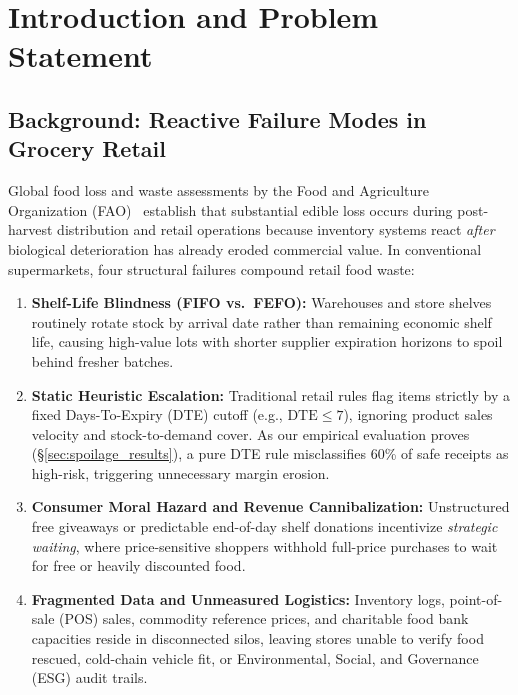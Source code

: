 \documentclass[11pt,a4paper]{article}
\renewcommand{\_}{\oldunderscore\allowbreak}
\begin{document}
\vspace{4mm}
\tableofcontents
\listoffigures
\listoftables
\newpage
{}

\section{Introduction and Problem Statement}

\subsection{Background: Reactive Failure Modes in Grocery Retail}
Global food loss and waste assessments by the Food and Agriculture Organization (FAO)~\cite{fao2019} establish that substantial edible loss occurs during post-harvest distribution and retail operations because inventory systems react \emph{after} biological deterioration has already eroded commercial value. In conventional supermarkets, four structural failures compound retail food waste:
\begin{enumerate}[leftmargin=18pt, itemsep=2pt]
    \item \textbf{Shelf-Life Blindness (FIFO vs.\ FEFO):} Warehouses and store shelves routinely rotate stock by arrival date rather than remaining economic shelf life, causing high-value lots with shorter supplier expiration horizons to spoil behind fresher batches.
    \item \textbf{Static Heuristic Escalation:} Traditional retail rules flag items strictly by a fixed Days-To-Expiry (DTE) cutoff (e.g., $\text{DTE} \le 7$), ignoring product sales velocity and stock-to-demand cover. As our empirical evaluation proves (§\ref{sec:spoilage_results}), a pure DTE rule misclassifies 60\% of safe receipts as high-risk, triggering unnecessary margin erosion.
    \item \textbf{Consumer Moral Hazard and Revenue Cannibalization:} Unstructured free giveaways or predictable end-of-day shelf donations incentivize \emph{strategic waiting}, where price-sensitive shoppers withhold full-price purchases to wait for free or heavily discounted food.
    \item \textbf{Fragmented Data and Unmeasured Logistics:} Inventory logs, point-of-sale (POS) sales, commodity reference prices, and charitable food bank capacities reside in disconnected silos, leaving stores unable to verify food rescued, cold-chain vehicle fit, or Environmental, Social, and Governance (ESG) audit trails.
\end{enumerate}
\end{document}
